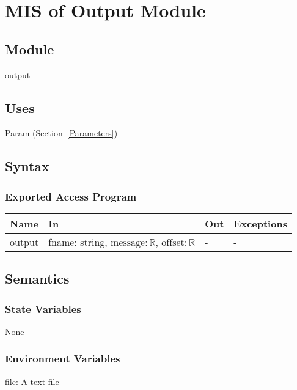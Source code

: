 \documentclass[12pt, titlepage]{article}
\begin{document}
\newpage
\section{MIS of Output Module} \label{Output}

\subsection{Module}

output

\subsection{Uses}

Param (Section~\ref{Parameters})

\subsection{Syntax}

\subsubsection{Exported Access Program}

\begin{center}
\begin{tabular}{p{3cm} p{7cm} p{2cm} p{2cm}}
\hline
\textbf{Name} & \textbf{In} & \textbf{Out} & \textbf{Exceptions} \\
\hline
output & fname: string, $\text{message} : \mathbb{R}$, $\text{offset} : \mathbb{R}$ & - & - \\
\hline
\end{tabular}
\end{center}

\subsection{Semantics}

\subsubsection{State Variables}

None

\subsubsection{Environment Variables}

file: A text file
\end{document}
